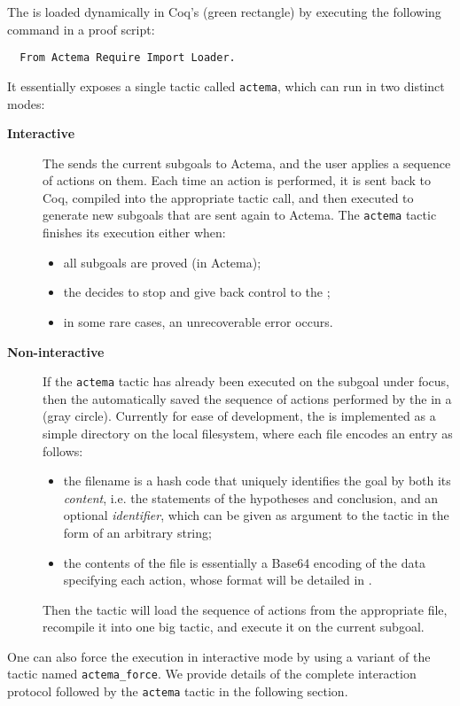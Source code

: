 The  is loaded dynamically in Coq's  (green
rectangle) by executing the following command in a proof script:
\begin{verbatim}
  From Actema Require Import Loader.
\end{verbatim}
It essentially exposes a single tactic called \texttt{actema}, which can run in
two distinct modes:
\begin{description}
  \item[\bfseries Interactive] The  sends the current subgoals
  to Actema, and the user applies a sequence of actions on them. Each time an
  action is performed, it is sent back to Coq, compiled into the appropriate
  tactic call, and then executed to generate new subgoals that are sent again to
  Actema. The \texttt{actema} tactic finishes its execution either when:
  \begin{itemize}
    \item all subgoals are proved (in Actema);
    \item the  decides to stop and give back control to the
    ;
    \item in some rare cases, an unrecoverable error occurs.
  \end{itemize}

  \item[\bfseries Non-interactive] If the \texttt{actema} tactic has already
  been executed on the subgoal under focus, then the 
  automatically saved the sequence of actions performed by the  in
  a  (gray circle). Currently for ease of development, the
   is implemented as a simple directory on the local
  filesystem, where each file encodes an entry as follows:
  \begin{itemize}
    \item the filename is a hash code that uniquely identifies the goal by both
    its \emph{content}, i.e. the statements of the hypotheses and conclusion,
    and an optional \emph{identifier}, which can be given as argument to the
    tactic in the form of an arbitrary string;
    \item the contents of the file is essentially a Base64 encoding of the data
    specifying each action, whose format will be detailed in
    .
  \end{itemize}
  Then the tactic will load the sequence of actions from the appropriate file,
  recompile it into one big tactic, and execute it on the current subgoal.
\end{description}
One can also force the execution in interactive mode by using a variant of the
tactic named \texttt{actema\_force}. We provide details of the complete
interaction protocol followed by the \texttt{actema} tactic in the following
section.


